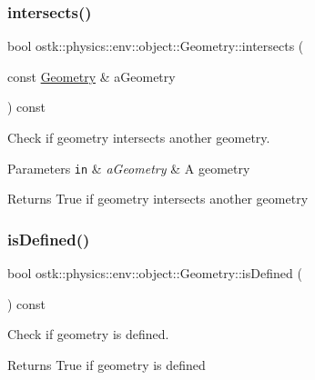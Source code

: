 \subsubsection{\texorpdfstring{intersects()}{intersects()}}
{\footnotesize\ttfamily bool ostk\+::physics\+::env\+::object\+::\+Geometry\+::intersects (\begin{DoxyParamCaption}\item[{const \hyperlink{classostk_1_1physics_1_1env_1_1object_1_1_geometry}{Geometry} \&}]{a\+Geometry }\end{DoxyParamCaption}) const}



Check if geometry intersects another geometry. 


\begin{DoxyParams}[1]{Parameters}
\mbox{\tt in}  & {\em a\+Geometry} & A geometry \\
\hline
\end{DoxyParams}
\begin{DoxyReturn}{Returns}
True if geometry intersects another geometry 
\end{DoxyReturn}
\mbox{\label{classostk_1_1physics_1_1env_1_1object_1_1_geometry_a46e3f9e3a85efd77a4df11fdfb544f4d}} 
\subsubsection{\texorpdfstring{is\+Defined()}{isDefined()}}
{\footnotesize\ttfamily bool ostk\+::physics\+::env\+::object\+::\+Geometry\+::is\+Defined (\begin{DoxyParamCaption}{ }\end{DoxyParamCaption}) const}



Check if geometry is defined. 

\begin{DoxyReturn}{Returns}
True if geometry is defined 
\end{DoxyReturn}
\mbox{\label{classostk_1_1physics_1_1env_1_1object_1_1_geometry_ae47daffb1f1e7341706a771dce7bd2f2}} 
